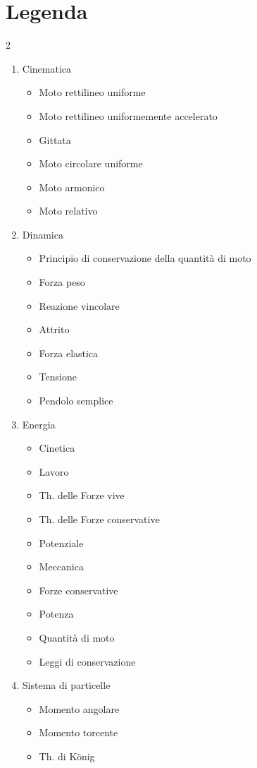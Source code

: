 \documentclass[a4paper,11pt]{article}
\begin{document}
\section*{Legenda}
\begin{multicols}{2}
\begin{enumerate}
\item Cinematica\begin{itemize}\item Moto rettilineo uniforme\item Moto rettilineo uniformemente accelerato\item Gittata\item Moto circolare uniforme\item Moto armonico\item Moto relativo\end{itemize}
\item Dinamica\begin{itemize}\item Principio di conservazione della quantità di moto\item Forza peso\item Reazione vincolare\item Attrito\item Forza elastica\item Tensione\item Pendolo semplice\end{itemize}
\item Energia\begin{itemize}\item Cinetica\item Lavoro\item Th. delle Forze vive\item Th. delle Forze conservative\item Potenziale\item Meccanica\item Forze conservative\item Potenza\item Quantità di moto\item Leggi di conservazione\end{itemize}
\item Sistema di particelle\begin{itemize}\item Momento angolare\item Momento torcente\item Th. di König\end{itemize}

\end{enumerate}
\end{multicols}
\end{document}
